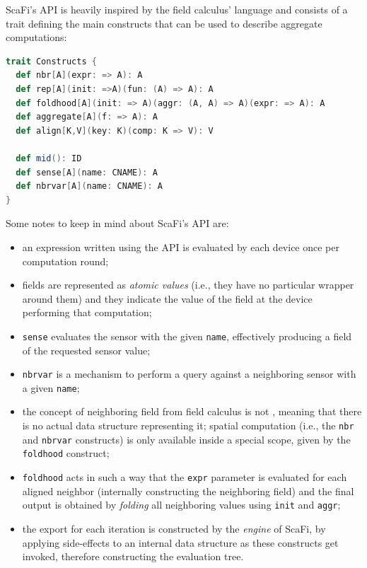 ScaFi's API is heavily inspired by the field calculus' language and consists of a trait defining the main constructs that can be used to describe aggregate computations:
%
\begin{lstlisting}[frame=single, language=scala]
trait Constructs {
  def nbr[A](expr: => A): A
  def rep[A](init: =>A)(fun: (A) => A): A
  def foldhood[A](init: => A)(aggr: (A, A) => A)(expr: => A): A
  def aggregate[A](f: => A): A
  def align[K,V](key: K)(comp: K => V): V

  def mid(): ID
  def sense[A](name: CNAME): A
  def nbrvar[A](name: CNAME): A
}
\end{lstlisting}
%
Some notes to keep in mind about ScaFi's API are:
%
\begin{itemize}
    \item an expression written using the API is evaluated by each device once per computation round;
    \item fields are represented as \textit{atomic values} (i.e., they have no particular wrapper around them) and they indicate the value of the field at the device performing that computation;
    \item \texttt{sense} evaluates the sensor with the given \texttt{name}, effectively producing a field of the requested sensor value;
    \item \texttt{nbrvar} is a mechanism to perform a query against a neighboring sensor with a given \texttt{name};
    \item the concept of neighboring field from field calculus is not , meaning that there is no actual data structure representing it; spatial computation (i.e., the \texttt{nbr} and \texttt{nbrvar} constructs) is only available inside a special scope, given by the \texttt{foldhood} construct;
    \item \texttt{foldhood} acts in such a way that the \texttt{expr} parameter is evaluated for each aligned neighbor (internally constructing the neighboring field) and the final output is obtained by \textit{folding} all neighboring values using \texttt{init} and \texttt{aggr};
    \item the export for each iteration is constructed by the \textit{engine} of ScaFi, by applying side-effects to an internal data structure as these constructs get invoked, therefore constructing the evaluation tree.
\end{itemize}

